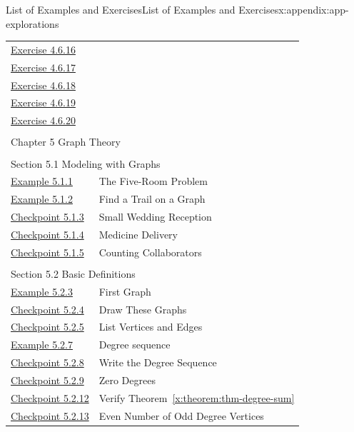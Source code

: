 \documentclass[oneside,10pt,]{book}
\newcommand{\xreffont}{\relax}
\numberwithin{equation}{section}
\begin{document}
\begin{appendixptx}{List of Examples and Exercises}{}{List of Examples and Exercises}{}{}{x:appendix:app-explorations}
\begin{longtable}[l]{ll}
\hyperlink{x:exercise:ex-cong-phi-prime-power-prod}{Exercise 4.6.16}& \\
\hyperlink{x:exercise:ex-cong-phi-multiplicative}{Exercise 4.6.17}& \\
\hyperlink{g:exercise:id542981}{Exercise 4.6.18}& \\
\hyperlink{g:exercise:id542974}{Exercise 4.6.19}& \\
\hyperlink{g:exercise:id542993}{Exercise 4.6.20}& \\
\multicolumn{2}{l}{\null}\\[1.5ex] \multicolumn{2}{l}{\large Chapter 5 Graph Theory}\\[0.5ex]
\multicolumn{2}{l}{\null}\\[1.5ex] \multicolumn{2}{l}{\large Section 5.1 Modeling with Graphs}\\[0.5ex]
\hyperref[x:example:eg-graph-model-room]{Example 5.1.1}& The Five-Room Problem\\
\hyperref[x:example:eg-graph-model-eulerian]{Example 5.1.2}& Find a Trail on a Graph\\
\hyperref[x:exercise:ex-graph-g8]{Checkpoint 5.1.3}& Small Wedding Reception\\
\hyperref[x:exercise:ex-graph-herbs]{Checkpoint 5.1.4}& Medicine Delivery\\
\hyperref[x:exercise:ex-graph-coauthors]{Checkpoint 5.1.5}& Counting Collaborators\\
\multicolumn{2}{l}{\null}\\[1.5ex] \multicolumn{2}{l}{\large Section 5.2 Basic Definitions}\\[0.5ex]
\hyperref[x:example:eg-graph-first]{Example 5.2.3}& First Graph\\
\hyperref[x:exercise:ex-graph-first-draw]{Checkpoint 5.2.4}& Draw These Graphs\\
\hyperref[x:exercise:ex-graph-first-list]{Checkpoint 5.2.5}& List Vertices and Edges\\
\hyperref[x:example:eg-graph-degree]{Example 5.2.7}& Degree sequence\\
\hyperref[x:exercise:ex-graph-degree]{Checkpoint 5.2.8}& Write the Degree Sequence\\
\hyperref[x:exercise:ex-graph-degree-zero]{Checkpoint 5.2.9}& Zero Degrees\\
\hyperref[x:exercise:ex-graph-degsum]{Checkpoint 5.2.12}& Verify Theorem~{\xreffont\ref*{x:theorem:thm-degree-sum}}\\
\hyperref[x:exercise:ex-graph-handshake]{Checkpoint 5.2.13}& Even Number of Odd Degree Vertices\\

\end{longtable}
\end{appendixptx}
\end{document}
